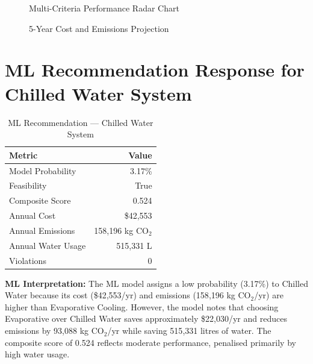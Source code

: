 \documentclass[12pt,a4paper]{report}
\begin{document}
\begin{figure}[H]
\centering
{}
\caption{Multi-Criteria Performance Radar Chart}
\label{fig:chw_radar}
\end{figure}

\begin{figure}[H]
\centering
{}
\caption{5-Year Cost and Emissions Projection}
\label{fig:chw_5yr}
\end{figure}

\section{ML Recommendation Response for Chilled Water System}

\begin{table}[H]
\centering
\caption{ML Recommendation --- Chilled Water System}
\label{tab:chw_ml}
\renewcommand{\arraystretch}{1.3}
\begin{tabular}{lr}
\toprule
\textbf{Metric} & \textbf{Value} \\
\midrule
Model Probability & 3.17\% \\
Feasibility & True \\
Composite Score & 0.524 \\
Annual Cost & \$42{,}553 \\
Annual Emissions & 158{,}196 kg CO$_2$ \\
Annual Water Usage & 515{,}331 L \\
Violations & 0 \\
\bottomrule
\end{tabular}
\end{table}

\noindent\textbf{ML Interpretation:} The ML model assigns a low probability (3.17\%) to Chilled Water
because its cost (\$42{,}553/yr) and emissions (158{,}196 kg CO$_2$/yr) are higher than Evaporative
Cooling. However, the model notes that choosing Evaporative over Chilled Water saves approximately
\$22{,}030/yr and reduces emissions by 93{,}088 kg CO$_2$/yr while saving 515{,}331 litres of water.
The composite score of 0.524 reflects moderate performance, penalised primarily by high water usage.
\end{document}
